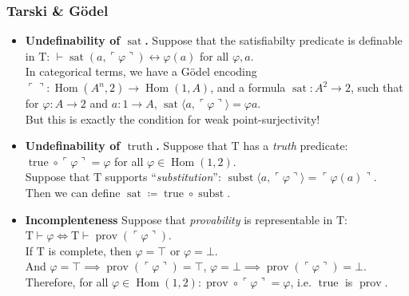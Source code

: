 \documentclass[UTF8,11pt,colorlinks,compress,openany]{beamer}%
\begin{document}
\begin{frame}\frametitle{Tarski \& G\"odel}
\begin{itemize}
	\item \textbf{Undefinability of $\operatorname{sat}$.} Suppose that the satisfiabilty predicate is definable in $\mathrm{T}$: $\vdash \operatorname{sat}(a,\ulcorner\varphi\urcorner)\leftrightarrow\varphi(a)$ for all $\varphi,a$.\\
	In categorical terms, we have a G\"odel encoding $\ulcorner \urcorner: \operatorname{Hom}(A^n,2)\to \operatorname{Hom}(1,A)$, and a formula $\operatorname{sat}: A^2\to 2$, such that for $\varphi: A\to 2$ and $a: 1\to A$, $\operatorname{sat}\langle a,\ulcorner\varphi\urcorner\rangle=\varphi a$.\\
	But this is exactly the condition for weak point-surjectivity!
	\item \textbf{Undefinability of $\operatorname{truth}$.} Suppose that $\mathrm{T}$ has a \emph{truth} predicate: $\operatorname{true}\circ\ulcorner\varphi\urcorner=\varphi$ for all $\varphi\in \operatorname{Hom}(1,2)$.\\
	Suppose that $\mathrm{T}$ supports ``\emph{substitution}'': $\operatorname{subst}\langle a,\ulcorner\varphi\urcorner\rangle=\ulcorner\varphi(a)\urcorner$.\\
	Then we can define $\operatorname{sat}\coloneqq\operatorname{true}\circ \operatorname{subst}$.
	\item \textbf{Incomplenteness} Suppose that \emph{provability} is representable in $\mathrm{T}$: $\mathrm{T}\vdash\varphi\iff\mathrm{T}\vdash\operatorname{prov}(\ulcorner\varphi\urcorner)$.\\
	If $\mathrm{T}$ is complete, then $\varphi=\top$ or $\varphi=\bot$.\\
	And $\varphi=\top\implies \operatorname{prov}(\ulcorner\varphi\urcorner)=\top$, $\varphi=\bot\implies \operatorname{prov}(\ulcorner\varphi\urcorner)=\bot$.\\
	Therefore, for all $\varphi\in \operatorname{Hom}(1,2): \operatorname{prov}\circ\ulcorner\varphi\urcorner=\varphi$, i.e. $\operatorname{true}$ is $\operatorname{prov}$.
\end{itemize}
\end{frame}
\end{document}
